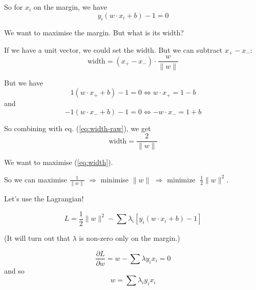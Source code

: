 So for $x_i$ on the margin, we have
\begin{equation}
  \label{eq:on-margin}
  \boxed{y_i(w\cdot x_i + b) - 1 = 0}
\end{equation}

We want to maximise the margin.  But what is its width?

If we have a unit vector, we could set the width.  But we can subtract $x_+-x_-$:
\begin{equation}
  \label{eq:width-raw}
  \mbox{width} = (x_+ - x_-) \cdot \frac{w}{\parallel w\parallel}
\end{equation}

But we have
\begin{displaymath}
  1(w\cdot x_+ + b) - 1 = 0 \iff w\cdot x_+ = 1-b
\end{displaymath}
and
\begin{displaymath}
  -1(w\cdot x_- + b) - 1 = 0 \iff -w\cdot x_- = 1+b
\end{displaymath}

So combining with eq. (\ref{eq:width-raw}), we get
\begin{equation}
  \label{eq:width}
  \mbox{width} = \frac{2}{\parallel w\parallel}
\end{equation}

We want to maximise (\ref{eq:width}).

So we can maximise $\frac{1}{\parallel w\parallel}$ $\Rightarrow$
minimise $\parallel w\parallel$ $\Rightarrow$
minimize $\;\frac 12 \parallel w\parallel^2$.

\bigskip

Let's use the Lagrangian!

\bigskip

\begin{equation}
  \label{eq:lagrangian}
  L = \frac 12 \parallel w\parallel^2 - \sum \lambda_i \left[ y_i(w\cdot
    x_i + b) - 1 \right]
\end{equation}

(It will turn out that $\lambda$ is non-zero only on the margin.)

\begin{displaymath}
  \frac{\partial L}{\partial w} = w - \sum\lambda y_i x_i = 0
\end{displaymath}
and so \hspace{2mm} 
\begin{equation}
  \label{eq:w}
  w = \sum\lambda_i y_i x_i
\end{equation}

